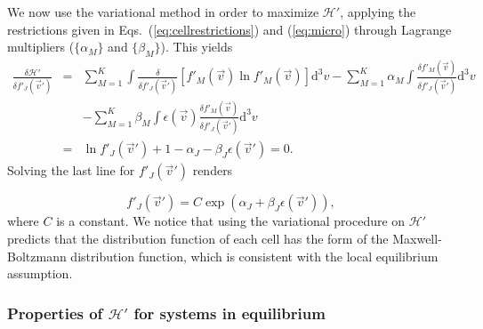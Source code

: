 We now use the variational method in order to maximize $\mathcal{H}'$, applying the restrictions
given in Eqs.~(\ref{eq:cellrestrictions}) and (\ref{eq:micro}) through Lagrange
multipliers ($\{\alpha_M\}$ and $\{\beta_M\}$). This yields
%
\begin{eqnarray}
    \frac{\delta \mathcal{H}'}{\delta f'_J(\vec{v}')} & = & \sum_{M=1}^{K}\int
      \frac{\delta}{\delta f'_J(\vec{v}')}\left[
        f'_M(\vec{v})\ln f'_M(\vec{v})
        \right]
       \mathrm{d}^3v -\sum_{M=1}^{K}\alpha_M\int
       	\frac{\delta f'_M(\vec{v})}{\delta f'_J(\vec{v}')}
      \mathrm{d}^3v\nonumber\\
    & & -\sum_{M=1}^{K}\beta_M\int\epsilon(\vec{v})
    	\frac{\delta f'_M(\vec{v})}{\delta f'_J(\vec{v}')}
      \mathrm{d}^3v \nonumber\\
    & = & \ln f'_J(\vec{v}')+1-\alpha_J-\beta_J \epsilon(\vec{v}')=0.
\end{eqnarray}
%
Solving the last line for $f'_J(\vec{v}')$ renders
%
\begin{comment}
\begin{eqnarray}
    \ln f'_J(\vec{v}') & = & \alpha_J+\beta_J \epsilon(\vec{v}')
       -1\quad\Rightarrow\quad f_J(\vec{v}')\\
    & = & e^{\alpha_J +\beta_J \epsilon(\vec{v}')-1}\nonumber\\
    & = & Ce^{\alpha_J+\beta_J \epsilon(\vec{v}') } \label{eq:relacion1},
\end{eqnarray}
\end{comment}
\begin{equation}\label{eq:relacion1}
	f'_J(\vec{v}') = C\exp\left({\alpha_J+\beta_J \epsilon(\vec{v}') }\right),
\end{equation}
%
where $C$ is a constant. We notice that using the variational procedure on
$\mathcal{H}'$ predicts that the
distribution function of each cell has the form of the Maxwell-Boltzmann
distribution function, which is consistent with the local equilibrium assumption.

\subsubsection{Properties of $\mathcal{H}'$ for systems in equilibrium}

